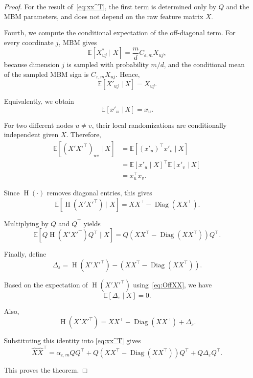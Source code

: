 \documentclass[conference,compsoc]{IEEEtran}
\theoremstyle{boldplain}
\theoremstyle{bolddefinition}
\theoremstyle{remark}
\newcommand{\mbmm}{MBM\xspace}
\begin{document}
\begin{proof}
For the result of~\autoref{eq:xx^T}, the first term is determined only by $Q$ and the \mbmm parameters, and does not depend on the raw feature matrix $X$.

Fourth, we compute the conditional expectation of the off-diagonal term. For every coordinate $j$, \mbmm gives
$$
    \mathbb{E}[X^*_{uj}\mid X]
    =
    \frac{m}{d} C_{\varepsilon,m}X_{uj},
$$
because dimension $j$ is sampled with probability $m/d$, and the conditional mean of the sampled \mbmm sign is $C_{\varepsilon,m}X_{uj}$. Hence,
$$
    \mathbb{E}[X'_{uj}\mid X]
    =
    X_{uj}.
$$

Equivalently, we obtain
$$
    \mathbb{E}[x'_u\mid X]=x_u.
$$

For two different nodes $u\neq v$, their local randomizations are conditionally independent given $X$. Therefore,
$$
\begin{aligned}
    \mathbb{E}\left[(X'X'^\top)_{uv}\mid X\right]
    &=
    \mathbb{E}\left[(x'_u)^\top x'_v\mid X\right] \\
    &=
    \mathbb{E}[x'_u\mid X]^\top
    \mathbb{E}[x'_v\mid X] \\
    &=
    x_u^\top x_v.
\end{aligned}
$$

Since $\operatorname{H}(\cdot)$ removes diagonal entries, this gives
\begin{equation}
\label{eq:OffXX}
    \mathbb{E}[\operatorname{H}(X'X'^\top)\mid X]
    =
    XX^\top-\operatorname{Diag}(XX^\top).
\end{equation}

Multiplying by $Q$ and $Q^\top$ yields
$$
    \mathbb{E}
    \left[
    Q\operatorname{H}(X'X'^\top)Q^\top
    \mid X
    \right]
    =
    Q(XX^\top-\operatorname{Diag}(XX^\top))Q^\top.   
$$

Finally, define
$$
    \Delta_\varepsilon
    =
    \operatorname{H}(X'X'^\top)
    -
    (XX^\top-\operatorname{Diag}(XX^\top)).
$$

Based on the expectation of $\operatorname{H}(X'X'^\top)$ using~\autoref{eq:OffXX}, we have
$$
    \mathbb{E}[\Delta_\varepsilon\mid X]=0.
$$

Also,
$$
    \operatorname{H}(X'X'^\top)
    =
    XX^\top-\operatorname{Diag}(XX^\top)
    +
    \Delta_\varepsilon.
$$

Substituting this identity into
\autoref{eq:xx^T}
gives
$$
\widehat X \widehat X^\top
=
\alpha_{\varepsilon,m} QQ^\top
+
Q(XX^\top-\operatorname{Diag}(XX^\top))Q^\top
+
Q\Delta_\varepsilon Q^\top.
$$

This proves the theorem.
\end{proof}
\end{document}
